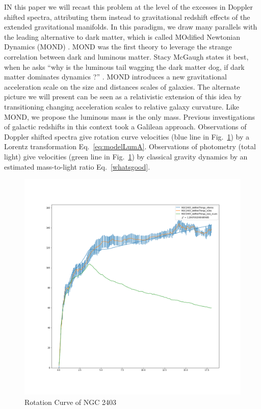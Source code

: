 \documentclass[reprint,%
 amsmath,amssymb,
 aps,
]{revtex4-1}
\begin{document}
 
 IN this paper we will recast this problem at the level of the excesses in Doppler shifted spectra,  attributing them instead    to gravitational redshift effects of the extended gravitational manifolds. 
 In this paradigm, we draw many parallels with the leading alternative to dark matter, which   is called MOdified Newtonian Dynamics (MOND) \cite{Milgrom}.  MOND was the first theory to leverage the strange correlation between dark and luminous matter. Stacy McGaugh states it best, when he asks    ``why is the luminous tail wagging the dark matter dog,  if dark matter dominates dynamics ?'' \cite{1999McGaugh}. MOND introduces a new gravitational acceleration scale on the size and distances scales of galaxies. 
 The alternate picture we will present     can   be seen as a relativistic extension of this idea by transitioning changing acceleration scales to    relative galaxy curvature.   Like MOND, we propose the luminous mass is the only mass. Previous investigations of galactic redshifts in this context    took a Galilean approach\cite{MTW}.
 Observations of Doppler shifted spectra give rotation curve velocities  (blue line  in Fig.~\ref{fig:NGC2403}) by a  Lorentz transformation Eq.~\ref{eq:modelLumA}. Observations of photometry (total light) give velocities (green line  in Fig.~\ref{fig:NGC2403}) by classical gravity dynamics by an estimated mass-to-light ratio Eq.~\ref{whatsgood}.  
 
  
  
  
  
 \begin{figure}[h!]
      \centering
      \includegraphics[width=\linewidth]{NGC2403_deBlokThings_XueSofue}
      \caption{Rotation Curve of NGC 2403 \cite{Blok1}}
      \label{fig:NGC2403}
  \end{figure}
  
\end{document}
